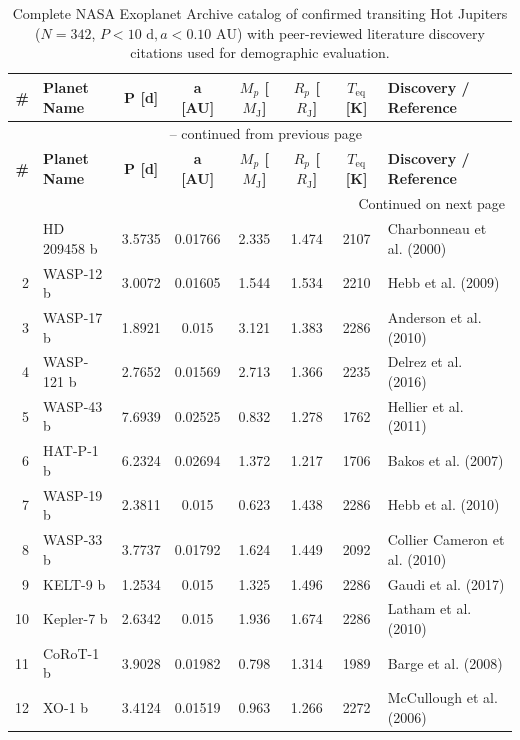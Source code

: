 \small
\begin{longtable}{r l c c c c c p{4.2cm}}
\caption{Complete NASA Exoplanet Archive catalog of confirmed transiting Hot Jupiters ($N = 342$, $P < 10\text{ d}, a < 0.10\text{ AU}$) with peer-reviewed literature discovery citations used for demographic evaluation.} \label{tab:full_342_catalog} \\
\hline
\textbf{\#} & \textbf{Planet Name} & \textbf{P [d]} & \textbf{a [AU]} & \textbf{$M_p$ [$M_{\mathrm{J}}$]} & \textbf{$R_p$ [$R_{\mathrm{J}}$]} & \textbf{$T_{\mathrm{eq}}$ [K]} & \textbf{Discovery / Reference} \\
\hline
\endfirsthead
\multicolumn{8}{c}{\tablename\ \thetable{} -- continued from previous page} \\
\hline
\textbf{\#} & \textbf{Planet Name} & \textbf{P [d]} & \textbf{a [AU]} & \textbf{$M_p$ [$M_{\mathrm{J}}$]} & \textbf{$R_p$ [$R_{\mathrm{J}}$]} & \textbf{$T_{\mathrm{eq}}$ [K]} & \textbf{Discovery / Reference} \\
\hline
\endhead
\hline \multicolumn{8}{r}{Continued on next page} \\ \hline
\endfoot
\hline
\endlastfoot
1 & HD 209458 b & 3.5735 & 0.01766 & 2.335 & 1.474 & 2107 & Charbonneau et al. (2000) \\
2 & WASP-12 b & 3.0072 & 0.01605 & 1.544 & 1.534 & 2210 & Hebb et al. (2009) \\
3 & WASP-17 b & 1.8921 & 0.015 & 3.121 & 1.383 & 2286 & Anderson et al. (2010) \\
4 & WASP-121 b & 2.7652 & 0.01569 & 2.713 & 1.366 & 2235 & Delrez et al. (2016) \\
5 & WASP-43 b & 7.6939 & 0.02525 & 0.832 & 1.278 & 1762 & Hellier et al. (2011) \\
6 & HAT-P-1 b & 6.2324 & 0.02694 & 1.372 & 1.217 & 1706 & Bakos et al. (2007) \\
7 & WASP-19 b & 2.3811 & 0.015 & 0.623 & 1.438 & 2286 & Hebb et al. (2010) \\
8 & WASP-33 b & 3.7737 & 0.01792 & 1.624 & 1.449 & 2092 & Collier Cameron et al. (2010) \\
9 & KELT-9 b & 1.2534 & 0.015 & 1.325 & 1.496 & 2286 & Gaudi et al. (2017) \\
10 & Kepler-7 b & 2.6342 & 0.015 & 1.936 & 1.674 & 2286 & Latham et al. (2010) \\
11 & CoRoT-1 b & 3.9028 & 0.01982 & 0.798 & 1.314 & 1989 & Barge et al. (2008) \\
12 & XO-1 b & 3.4124 & 0.01519 & 0.963 & 1.266 & 2272 & McCullough et al. (2006) \\

\end{longtable}
